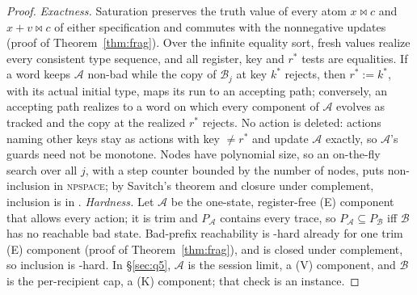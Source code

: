 \begin{proof}
\emph{Exactness.} Saturation preserves the truth value of every atom $x\bowtie c$ and $x+v\bowtie c$ of either specification and commutes with
the nonnegative updates (proof of Theorem~\ref{thm:frag}). Over the infinite equality sort, fresh values realize every consistent type sequence,
and all register, key and $r^\ast$ tests are equalities. If a word keeps $\mathcal A$ non-bad while the copy of $\mathcal B_j$ at key $k^\ast$ rejects,
then $r^\ast:=k^\ast$, with its actual initial type, maps its run to an accepting path; conversely, an accepting path realizes to a word on which
every component of $\mathcal A$ evolves as tracked and the copy at the realized $r^\ast$ rejects. No action is deleted: actions naming other keys stay
as actions with key $\neq r^\ast$ and update $\mathcal A$ exactly, so $\mathcal A$'s guards need not be monotone. Nodes have polynomial size, so an
on-the-fly search over all $j$, with a step counter bounded by the number of nodes, puts non-inclusion in \textsc{npspace}; by Savitch's theorem
and closure under complement, inclusion is in \PSPACE{}.
\emph{Hardness.} Let $\mathcal A$ be the one-state, register-free (E) component that allows every action; it is trim and $P_{\mathcal A}$ contains
every trace, so $P_{\mathcal A}\subseteq P_{\mathcal B}$ iff $\mathcal B$ has no reachable bad state. Bad-prefix reachability is \PSPACE-hard already for
one trim (E) component (proof of Theorem~\ref{thm:frag}), and \PSPACE{} is closed under complement, so inclusion is \PSPACE-hard.
In \S\ref{sec:q5}, $\mathcal A$ is the session limit, a (V) component, and $\mathcal B$ is the per-recipient cap, a (K) component; that check is an instance.
\end{proof}

